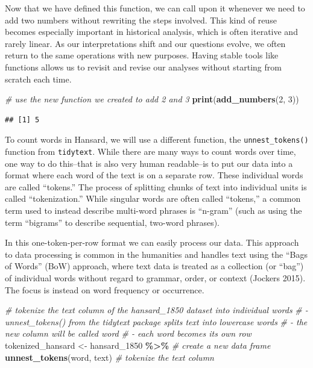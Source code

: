 \documentclass[
]{article}
\newenvironment{Shaded}{\begin{snugshade}}{\end{snugshade}}
\newcommand{\CommentTok}[1]{\textcolor[rgb]{0.56,0.35,0.01}{\textit{#1}}}
\newcommand{\DecValTok}[1]{\textcolor[rgb]{0.00,0.00,0.81}{#1}}
\newcommand{\FunctionTok}[1]{\textcolor[rgb]{0.13,0.29,0.53}{\textbf{#1}}}
\newcommand{\NormalTok}[1]{#1}
\newcommand{\OtherTok}[1]{\textcolor[rgb]{0.56,0.35,0.01}{#1}}
\newcommand{\SpecialCharTok}[1]{\textcolor[rgb]{0.81,0.36,0.00}{\textbf{#1}}}
\begin{document}
Now that we have defined this function, we can call upon it whenever we
need to add two numbers without rewriting the steps involved. This kind
of reuse becomes especially important in historical analysis, which is
often iterative and rarely linear. As our interpretations shift and our
questions evolve, we often return to the same operations with new
purposes. Having stable tools like functions allows us to revisit and
revise our analyses without starting from scratch each time.

\begin{Shaded}
\begin{Highlighting}[]
\CommentTok{\# use the new function we created to add 2 and 3}
\FunctionTok{print}\NormalTok{(}\FunctionTok{add\_numbers}\NormalTok{(}\DecValTok{2}\NormalTok{, }\DecValTok{3}\NormalTok{))}
\end{Highlighting}
\end{Shaded}

\begin{verbatim}
## [1] 5
\end{verbatim}

To count words in Hansard, we will use a different function, the
\texttt{unnest\_tokens()} function from \texttt{tidytext}. While there
are many ways to count words over time, one way to do this--that is also
very human readable--is to put our data into a format where each word of
the text is on a separate row. These individual words are called
``tokens.'' The process of splitting chunks of text into individual
units is called ``tokenization.'' While singular words are often called
``tokens,'' a common term used to instead describe multi-word phrases is
``n-gram'' (such as using the term ``bigrams'' to describe sequential,
two-word phrases).

In this one-token-per-row format we can easily process our data. This
approach to data processing is common in the humanities and handles text
using the ``Bags of Words'' (BoW) approach, where text data is treated
as a collection (or ``bag'') of individual words without regard to
grammar, order, or context (Jockers 2015). The focus is instead on word
frequency or occurrence.

\begin{Shaded}
\begin{Highlighting}[]
\CommentTok{\# tokenize the \textquotesingle{}text\textquotesingle{} column of the hansard\_1850 dataset into individual words}
\CommentTok{\# {-} \textquotesingle{}unnest\_tokens()\textquotesingle{} from the \textquotesingle{}tidytext\textquotesingle{} package splits text into lowercase words}
\CommentTok{\# {-} the new column will be called \textquotesingle{}word\textquotesingle{}}
\CommentTok{\# {-} each word becomes its own row }
\NormalTok{tokenized\_hansard }\OtherTok{\textless{}{-}}\NormalTok{ hansard\_1850 }\SpecialCharTok{\%\textgreater{}\%} \CommentTok{\# create a new data frame}
  \FunctionTok{unnest\_tokens}\NormalTok{(word, text) }\CommentTok{\# tokenize the \textquotesingle{}text\textquotesingle{} column }
\end{Highlighting}
\end{Shaded}
\end{document}
